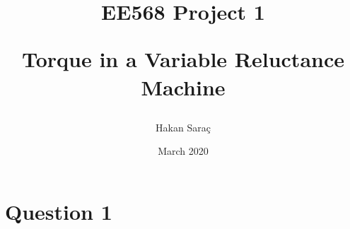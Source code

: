 \documentclass{article}
\title{EE568 Project 1

Torque in a Variable Reluctance Machine
}
\author{Hakan Saraç}
\date{March 2020}
\begin{document}
\maketitle 

\section{Question 1}
    
\end{document}

